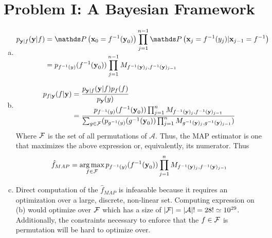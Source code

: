 \documentclass{siamart190516}
\begin{document}
\maketitle

\section*{Problem I: A Bayesian Framework}
\label{sec:bayesian}


\begin{enumerate}[(a)]

  \item \begin{align*}
          p_{\textbf{y}|f}(\textbf{y}|f) & = \prob{ \textbf{x}_0 = \inv{f}(\textbf{y}_0)} \prod_{j = 1}^{n-1} \prob{\textbf{x}_j = \inv{f}(y_j) | \textbf{x}_{j-1} = \inv{f}} \\
                                         & = p_{\inv{f}(y)}(\inv{f}(\textbf{y}_0)) \prod_{j = 1}^{n-1} M_{\inv{f}(\textbf{y})_{j}, \inv{f}(\textbf{y})_{j-1}}
        \end{align*}

  \item \begin{align*}
          p_{f|\textbf{y}}(f | \textbf{y}) & = \frac{ p_{\textbf{y}|f}(\textbf{y}|f) p_{f}(f) }{p_\textbf{y}(y)}                                                                                                                                                                                  \\
                                           & = \frac{p_{f^{-1}(y)}(f^{-1}(\textbf{y}_0)) \prod_{j = 1}^n M_{f^{-1}(\textbf{y})_{j}, f^{-1}(\textbf{y})_{j-1}}}{\sum_{g \in \mathcal{F}}(p_{g^{-1}(y)}(g^{-1}(\textbf{y}_0)) \prod_{j = 1}^n M_{g^{-1}(\textbf{y})_{j}, g^{-1}(\textbf{y})_{j-1}})}
        \end{align*}
        Where $\mathcal{F}$ is the set of all permutations of $\mathcal{A}$. Thus, the MAP estimator is one that maximizes the above expression or, equivalently, its numerator. Thus
        \[
          \hat{f}_{MAP} = \operatorname*{arg\,max}_{f \in \mathcal{F}} p_{f^{-1}(y)}(f^{-1}(\textbf{y}_0)) \prod_{j = 1}^n M_{f^{-1}(\textbf{y})_{j}, f^{-1}(\textbf{y})_{j-1}}
        \]
  \item Direct computation of the $\hat{f}_{MAP}$ is infeasable because it requires an optimization over a large, discrete, non-linear set. Computing expression on (b) would optimize over $\mathcal{F}$ which has a size of $\left| \mathcal{F} \right| = \left| \mathcal{A} \right|! = 28! \simeq 10^{29}$. Additionally, the constraints necessary to enforce that the $f \in \mathcal{F}$ is permutation will be hard to optimize over.
\end{enumerate}
\end{document}
